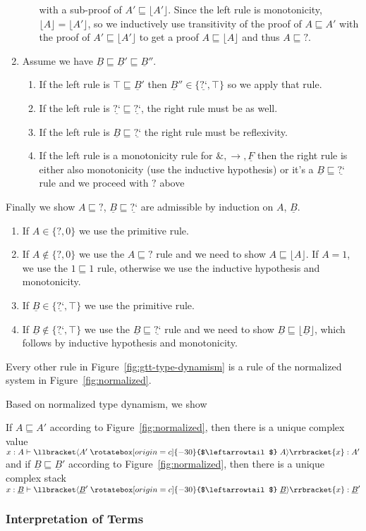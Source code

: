 \documentclass[acmsmall,screen,12pt]{acmart}
\renewcommand{\u}{\underline}
\newcommand{\sem}[1]{\llbracket#1\rrbracket}
\newcommand{\supcast}[2]{\sem{\upcast{#1}{#2}}}
\newcommand{\floor}[1]{\lfloor#1\rfloor}
\newcommand{\ltdyn}{\sqsubseteq}
\newcommand{\dynv}{{?}}
\newcommand{\dync}{\u {\text{?`}}}
\newcommand{\uarrow}{\mathrel{\rotatebox[origin=c]{-30}{$\leftarrowtail$}}}
\newcommand{\upcast}[2]{\langle{#2}\uarrow{#1}\rangle}
\newcommand{\with}{\mathbin{\&}}
\begin{document}
\begin{longonly}
\begin{longproof}
\begin{enumerate}
\begin{enumerate}
      with a sub-proof of $A' \ltdyn \floor{A'}$. Since the left rule
      is monotonicity, $\floor{A} = \floor{A'}$, so we inductively use
      transitivity of the proof of $A \ltdyn A'$ with the proof of $A'
      \ltdyn \floor{A'}$ to get a proof $A \ltdyn \floor{A}$ and thus
      $A \ltdyn \dynv$.
    \end{enumerate}
  \item Assume we have $\u B \ltdyn \u B' \ltdyn \u B''$.
    \begin{enumerate}
    \item If the left rule is $\top \ltdyn \u B'$ then $\u B'' \in
      \{\dync, \top\}$ so we apply that rule.
    \item If the left rule is $\dync\ltdyn \dync$, the right rule must
      be as well.
    \item If the left rule is $\u B \ltdyn \dync$ the right rule must
      be reflexivity.
    \item If the left rule is a monotonicity rule for $\with, \to, \u
      F$ then the right rule is either also monotonicity (use the
      inductive hypothesis) or it's a $\u B \ltdyn \dync$ rule and we
      proceed with $\dynv$ above
    \end{enumerate}
  \end{enumerate}
  Finally we show $A \ltdyn \dynv$, $\u B \ltdyn \dync$ are admissible
  by induction on $A$, $\u B$.  
  \begin{enumerate}
  \item If $A \in \{ \dynv, 0\}$ we use the primitive rule.
  \item If $A \not\in \{ \dynv, 0 \}$ we use the $A \ltdyn \dynv$ rule
    and we need to show $A \ltdyn \floor A$. If $A = 1$, we use the
    $1\ltdyn 1$ rule, otherwise we use the inductive hypothesis and
    monotonicity.
  \item If $\u B \in \{ \dync, \top\}$ we use the primitive rule.
  \item If $\u B \not\in \{ \dync, \top \}$ we use the $\u B \ltdyn
    \dync$ rule and we need to show $\u B \ltdyn \floor {\u B}$, which
    follows by inductive hypothesis and monotonicity.
  \end{enumerate}
  Every other rule in Figure~\ref{fig:gtt-type-dynamism} is a rule of
  the normalized system in Figure~\ref{fig:normalized}.
\end{longproof}

Based on normalized type dynamism, we show
\begin{theorem}
If $A \ltdyn A'$ according to Figure~\ref{fig:normalized}, then there is
a unique complex value $x : A \vdash \supcast{A}{A'}{x} : A'$
and
if $\u B \ltdyn \u B'$ according to Figure~\ref{fig:normalized}, then there is
a unique complex stack $x : \u B \vdash \supcast{\u B}{\u B'}{x} : \u B'$
\end{theorem}

\smallskip
\subsubsection{Interpretation of Terms}~
\end{longonly}
\end{document}
